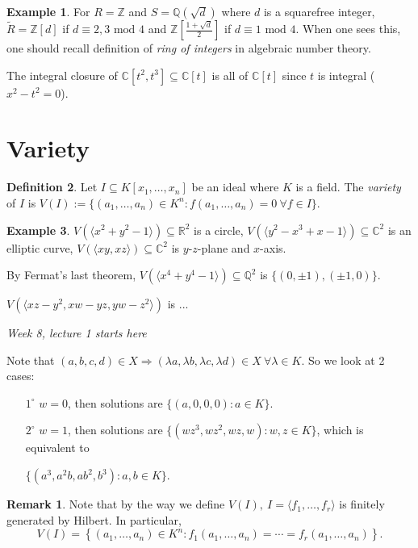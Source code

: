 \documentclass[a4paper]{article}
\newcommand{\la}{\langle}
\newcommand{\ra}{\rangle}
\newcommand{\Z}{\mathbb Z}
\newcommand{\Q}{\mathbb Q}
\newcommand{\C}{\mathbb C}
\newcommand{\Mod}{\text{ mod }}
\theoremstyle{definition}
\newtheorem{defn}{Definition}[subsection]
\newtheorem{example}[defn]{Example}
\newtheorem*{remark}{Remark}
\begin{document}
\begin{example}
For $R=\Z$ and $S=\Q\left(\sqrt d\right)$ where $d$ is a squarefree integer, $\widetilde R=\Z[d]$ if $d\equiv 2,3\Mod 4$ and $\Z\left[\frac{1+\sqrt d}{2}\right]$ if $d\equiv 1\Mod 4$. When one sees this, one should recall definition of \textit{ring of integers} in algebraic number theory.

The integral closure of $\C[t^2,t^3]\subseteq \C[t]$ is all of $\C[t]$ since $t$ is integral ($x^2-t^2=0$).
\end{example}

\section{Variety}
\begin{defn}
Let $I\subseteq K[x_1,\ldots,x_n]$ be an ideal where $K$ is a field. The \textit{variety} of $I$ is $V(I):=\{(a_1,\ldots,a_n)\in K^n:f(a_1,\ldots,a_n)=0 \ \forall f\in I\}$.
\end{defn}

\begin{example}
$V(\la x^2+y^2-1 \ra)\subseteq \mathbb R^2$ is a circle, $V(\la y^2-x^3+x-1 \ra)\subseteq \C^2$ is an elliptic curve,  $V(\la xy,xz \ra)\subseteq \C^2$ is $y$-$z$-plane and $x$-axis. 

By Fermat's last theorem, $V(\la x^4+y^4-1\ra)\subseteq \Q^2$ is $\{(0,\pm1),(\pm1,0)\}$.

$V(\la xz-y^2,xw-yz,yw-z^2 \ra)$ is ...
\end{example}

\begin{flushright}
\textit{Week 8, lecture 1 starts here}
\end{flushright}

Note that $(a,b,c,d)\in X\Rightarrow (\lambda a,\lambda b,\lambda c,\lambda d)\in X \ \forall \lambda\in K$. So we look at 2 cases:
\begin{enumerate}
\item[$1^\circ$] $w=0$, then solutions are $\{(a,0,0,0):a\in K\}$.
\item[$2^\circ$] $w=1$, then solutions are $\{(wz^3,wz^2,wz,w):w,z\in K\}$, which is equivalent to

$\{(a^3,a^2b,ab^2,b^3):a,b\in K\}$.
\end{enumerate}

\begin{remark}
Note that by the way we define $V(I),\ I=\la f_1,\ldots,f_r\ra$ is finitely generated by Hilbert. In particular,
\[
V(I)=\left\{ (a_1,\ldots,a_n)\in K^n:f_1(a_1,\ldots,a_n)=\cdots=f_r(a_1,\ldots,a_n) \right\}.
\] 
\end{remark}
\end{document}

